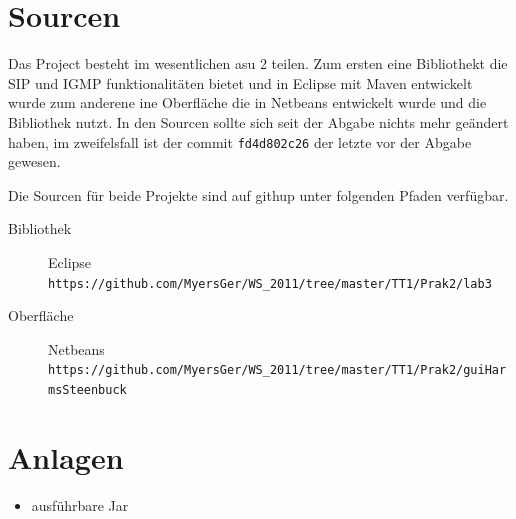 \documentclass[10pt]{scrartcl}
\begin{document}
\section{Sourcen}
Das Project besteht im wesentlichen asu 2 teilen. Zum ersten eine Bibliothekt die SIP und IGMP funktionalitäten bietet und in Eclipse mit Maven entwickelt wurde zum anderene ine Oberfläche die in Netbeans entwickelt wurde und die Bibliothek nutzt. In den Sourcen sollte sich seit der Abgabe nichts mehr geändert haben, im zweifelsfall ist der commit \verb!fd4d802c26! der letzte vor der Abgabe gewesen.

Die Sourcen für beide Projekte sind auf githup unter folgenden Pfaden verfügbar.
\begin{description}
	\item[Bibliothek] Eclipse \\ \verb!https://github.com/MyersGer/WS_2011/tree/master/TT1/Prak2/lab3!
	\item[Oberfläche] Netbeans \\ \verb!https://github.com/MyersGer/WS_2011/tree/master/TT1/Prak2/guiHarmsSteenbuck!
\end{description}

\section{Anlagen}
\begin{itemize}
	\item ausführbare Jar
\end{itemize}
\end{document}
